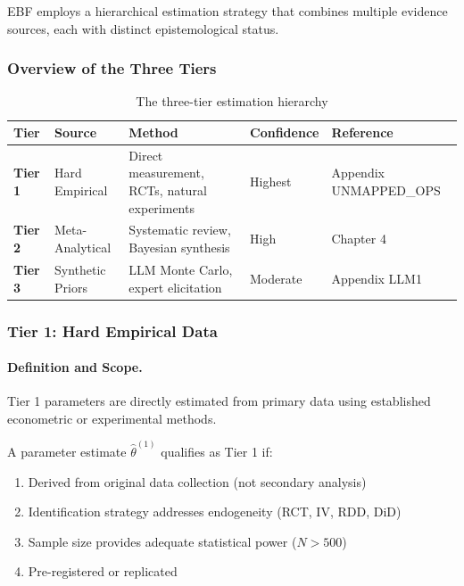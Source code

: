 EBF employs a hierarchical estimation strategy that combines multiple 
evidence sources, each with distinct epistemological status.

\subsubsection{Overview of the Three Tiers}

\begin{table}[h]
\centering
\small
\begin{tabular}{p{1.5cm}p{3cm}p{3.5cm}p{2cm}p{2cm}}
\toprule
\textbf{Tier} & \textbf{Source} & \textbf{Method} & \textbf{Confidence} & \textbf{Reference} \\
\midrule
\textbf{Tier 1} & Hard Empirical & Direct measurement, RCTs, natural experiments & Highest & Appendix UNMAPPED_OPS \\
\textbf{Tier 2} & Meta-Analytical & Systematic review, Bayesian synthesis & High & Chapter 4 \\
\textbf{Tier 3} & Synthetic Priors & LLM Monte Carlo, expert elicitation & Moderate & Appendix LLM1 \\
\bottomrule
\end{tabular}
\caption{The three-tier estimation hierarchy}
\label{tab:three-tiers}
\end{table}

\subsubsection{Tier 1: Hard Empirical Data}

\paragraph{Definition and Scope.}

Tier 1 parameters are directly estimated from primary data using established 
econometric or experimental methods.

\begin{definition}
A parameter estimate $\hat{\theta}^{(1)}$ qualifies as Tier 1 if:
\begin{enumerate}
    \item Derived from original data collection (not secondary analysis)
    \item Identification strategy addresses endogeneity (RCT, IV, RDD, DiD)
    \item Sample size provides adequate statistical power ($N > 500$)
    \item Pre-registered or replicated
\end{enumerate}
\end{definition}


